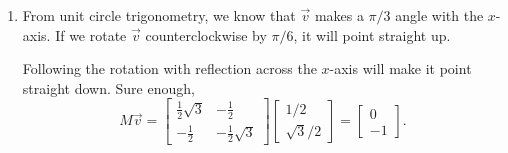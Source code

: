 \documentclass{ximera}
\begin{document}
\begin{example}
\begin{explanation}
\begin{enumerate}
\item From unit circle trigonometry, we know that $\vec{v}$ makes a $\pi/3$ angle with the $x$-axis.  If we rotate $\vec{v}$ counterclockwise by $\pi /6$, it will point straight up.  

\begin{center}
\end{center}


Following the rotation with reflection across the $x$-axis will make it point straight down.  Sure enough, 
$$M\vec{v} = \begin{bmatrix}
\frac{1}{2}\sqrt{3} & -\frac{1}{2} \\
-\frac{1}{2} & -\frac{1}{2}\sqrt{3}
\end{bmatrix} \begin{bmatrix}
    1/2 \\ \sqrt{3}/2 \end{bmatrix} = \begin{bmatrix}
    0 \\ -1 \end{bmatrix}.$$
\end{enumerate}
\end{explanation} 
\end{example}
\end{document}
